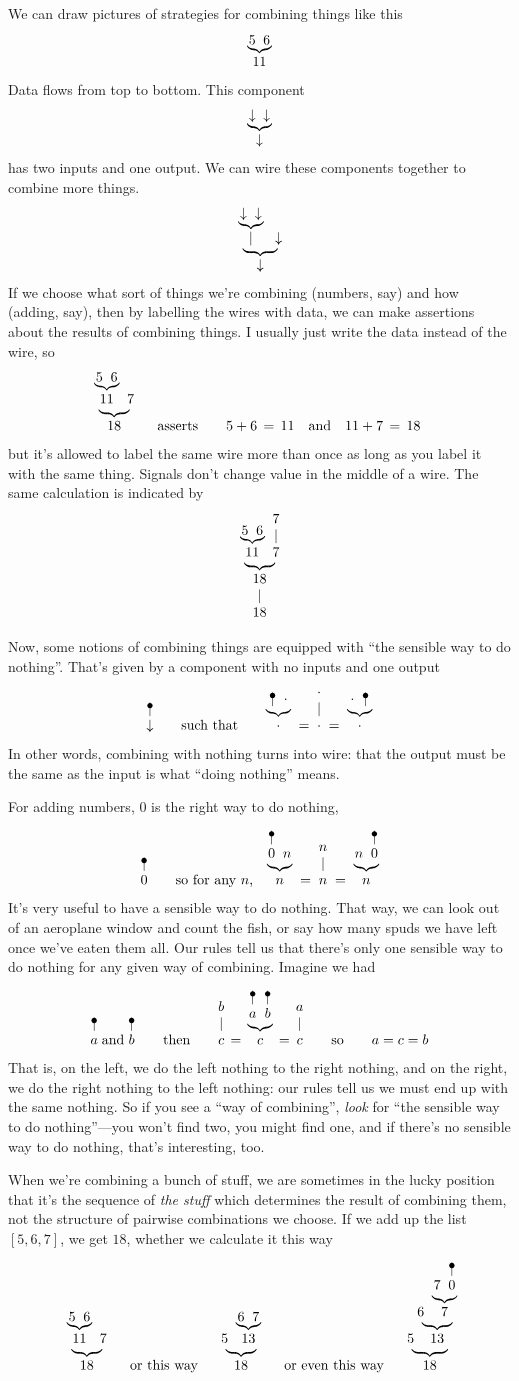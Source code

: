 \documentclass{book}
\begin{document}
We can draw pictures of strategies for combining things like this
\[
\wye{5}{6}{11}
\]
Data flows from top to bottom. This component
\[
\wye\downarrow\downarrow\downarrow
\]
has two inputs and one output. We can wire these components together to combine more things.
\[
\wye{\wye\downarrow\downarrow\mid}\downarrow\downarrow
\]
If we choose what sort of things we're combining (numbers, say) and how (adding, say), then by labelling the wires with data, we can make assertions about the results of combining things. I usually just write the data instead of the wire, so
\[
\wye{\wye{5}{6}{11}}{7}{18}
\qquad\mbox{asserts}\qquad
5 + 6 \,=\, 11\quad\mbox{and}\quad 11 + 7 \,=\, 18
\]
but it's allowed to label the same wire more than once as long as you label it with the same thing. Signals don't change value in the middle of a wire. The same calculation is indicated by
\[
\wye{\wye{5}{6}{11}}{\wid{7}}{\wid{18}}
\]

Now, some notions of combining things are equipped with ``the sensible way to do nothing''. That's given by a component with no inputs and one output
\[
\naw{\downarrow}
\qquad\mbox{such that}\qquad
\wye{\naw{}}\cdot\cdot \;=\; \wid\cdot \;=\;\wye\cdot{\naw{}}\cdot
\]
In other words, combining with nothing turns into wire: that the output must be the same as the input is what ``doing nothing'' means.

For adding numbers, 0 is the right way to do nothing,
\[
\naw{0}
\qquad\mbox{so for any $n$,}\quad
\wye{\naw{0}}nn \;=\; \wid n \;=\;\wye n{\naw{0}}n
\]
It's very useful to have a sensible way to do nothing. That way, we can look out of an aeroplane window and count the fish, or say how many spuds we have left once we've eaten them all. Our rules tell us that there's only one sensible way to do nothing for any given way of combining. Imagine we had
\[
\naw{a} \; \mbox{and}\; \naw{b}
\qquad\mbox{then}\qquad
\wir bc\,=\,\wye{\naw{a}}{\naw{b}}c\,=\,\wir ac
\qquad\mbox{so}\qquad a = c = b
\]
That is, on the left, we do the left nothing to the right nothing, and on the right, we do the right nothing to the left nothing: our rules tell us we must end up with the same nothing. So if you see a ``way of combining'', \emph{look} for ``the sensible way to do nothing''---you won't find two, you might find one, and if there's no sensible way to do nothing, that's interesting, too.

When we're combining a bunch of stuff, we are sometimes in the lucky position that it's the sequence of \emph{the stuff} which determines the result of combining them, not the structure of pairwise combinations we choose. If we add up the list $[5,6,7]$, we get $18$, whether we calculate it this way
\[
\wye{\wye56{11}}7{18}
\qquad\mbox{or this way}\qquad
\wye5{\wye67{13}}{18}
\qquad\mbox{or even this way}\qquad
\wye5{\wye6{\wye7{\naw0}7}{13}}{18}
\]
\end{document}

